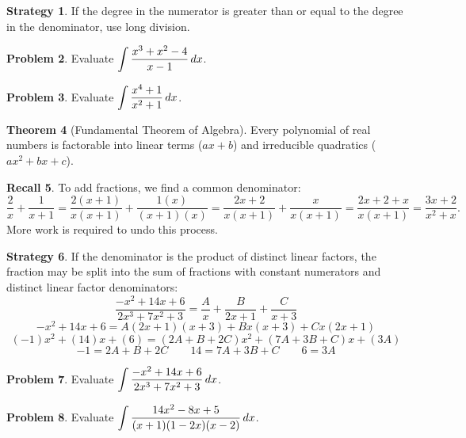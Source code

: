 \documentclass[letterpaper, twoside, 12pt]{book}
\theoremstyle{definition}
\newtheorem{theorem}{Theorem}
\newtheorem{recall}[theorem]{Recall}
\theoremstyle{definition}
\newtheorem{problem}[theorem]{Problem}
\newtheorem{strategy}[theorem]{Strategy}
\newcommand{\ds}{\ensuremath{\displaystyle}}
\begin{document}
\begin{strategy}
 If the degree in the numerator is greater than or equal to the degree in the
 denominator, use long division.
\end{strategy}

\begin{problem}
 Evaluate $\ds \int \frac{x^3 + x^2 - 4}{x-1} \, dx$.
\end{problem}

\vfill

\begin{problem}
 Evaluate $\ds \int \frac{x^4+1}{x^2+1} \, dx$.
\end{problem}

\vfill

\begin{theorem}[Fundamental Theorem of Algebra]
 Every polynomial of real numbers is factorable into linear terms ($ax+b$)
 and irreducible quadratics ($ax^2+bx+c$).
\end{theorem}

\begin{recall}
  To add fractions, we find a common denominator:
  \[
    \frac{2}{x} + \frac{1}{x+1}
      =
    \frac{2(x+1)}{x(x+1)} + \frac{1(x)}{(x+1)(x)}
      =
    \frac{2x+2}{x(x+1)} + \frac{x}{x(x+1)}
      =
    \frac{2x+2+x}{x(x+1)}
      =
    \frac{3x+2}{x^2+x}.
  \]
  More work is required to undo this process.
\end{recall}

\newpage

\begin{strategy}
 If the denominator is the product of distinct linear factors,
 the fraction may be split into the sum of fractions with constant numerators
 and distinct linear factor denominators:
  \[
    \frac{-x^2+14x+6}{2x^3+7x^2+3}
      =
    \frac{A}{x} + \frac{B}{2x+1} + \frac{C}{x+3}
  \]
  \[
    -x^2+14x+6 = A(2x+1)(x+3) + Bx(x+3) + Cx(2x+1)
  \]
  \[
    (-1)x^2+(14)x+(6) = (2A+B+2C)x^2 + (7A+3B+C)x + (3A)
  \]
  \[
    -1 = 2A+B+2C \qquad 14=7A+3B+C \qquad 6 = 3A
  \]
\end{strategy}

\begin{problem}
 Evaluate $\ds \int \frac{-x^2+14x+6}{2x^3+7x^2+3} \, dx$.
\end{problem}

\vfill

\newpage

\begin{problem}
 Evaluate $\ds \int \frac{14x^2-8x+5}{(x+1)(1-2x)(x-2)} \, dx$.
\end{problem}
\end{document}
